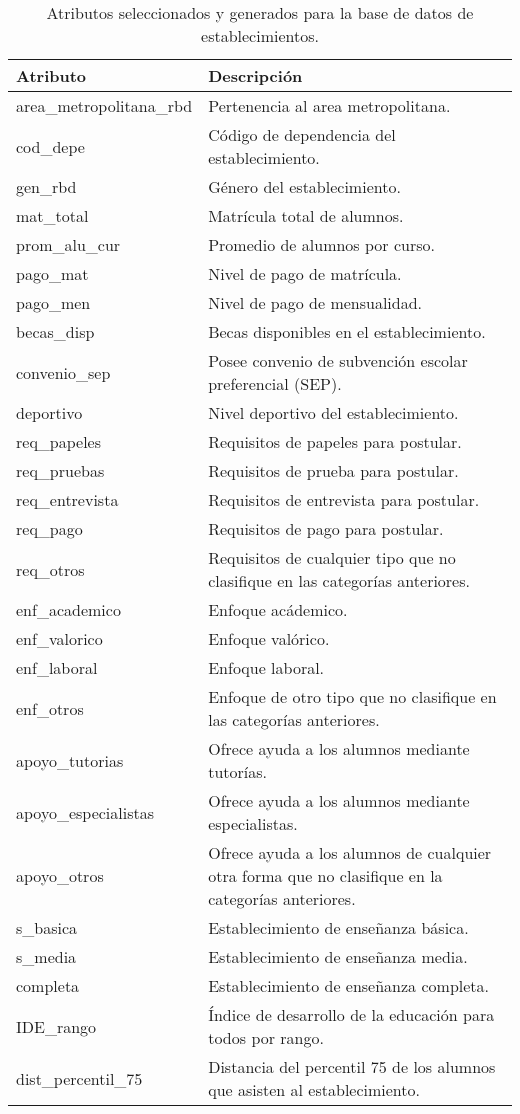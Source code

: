 \begin{table}[]
\centering
\caption{Atributos seleccionados y generados para la base de datos de establecimientos.}
\label{my-label}
\begin{tabular}{|p{5cm}|p{9	cm}|}
\hline
\textbf{Atributo}  & \textbf{Descripción} \\ \hline
area\_metropolitana\_rbd & Pertenencia al area metropolitana. \\ \hline
cod\_depe & Código de dependencia del establecimiento. \\ \hline
gen\_rbd & Género del establecimiento. \\ \hline
mat\_total & Matrícula total de alumnos. \\ \hline
prom\_alu\_cur & Promedio de alumnos por curso. \\ \hline
pago\_mat & Nivel de pago de matrícula. \\ \hline
pago\_men & Nivel de pago de mensualidad. \\ \hline
becas\_disp & Becas disponibles en el establecimiento. \\ \hline
convenio\_sep & Posee convenio de subvención escolar preferencial (SEP). \\ \hline
deportivo & Nivel deportivo del establecimiento. \\ \hline
req\_papeles & Requisitos de papeles para postular. \\ \hline
req\_pruebas & Requisitos de prueba para postular. \\ \hline
req\_entrevista & Requisitos de entrevista para postular. \\ \hline
req\_pago & Requisitos de pago para postular. \\ \hline
req\_otros & Requisitos de cualquier tipo que no clasifique en las categorías anteriores. \\ \hline
enf\_academico & Enfoque acádemico. \\ \hline
enf\_valorico & Enfoque valórico. \\ \hline
enf\_laboral & Enfoque laboral. \\ \hline
enf\_otros & Enfoque de otro tipo que no clasifique en las categorías anteriores. \\ \hline
apoyo\_tutorias & Ofrece ayuda a los alumnos mediante tutorías. \\ \hline
apoyo\_especialistas & Ofrece ayuda a los alumnos mediante especialistas. \\ \hline
apoyo\_otros & Ofrece ayuda a los alumnos de cualquier otra forma que no clasifique en la categorías anteriores. \\ \hline
s\_basica & Establecimiento de enseñanza básica. \\ \hline
s\_media & Establecimiento de enseñanza media. \\ \hline
completa & Establecimiento de enseñanza completa. \\ \hline
IDE\_rango & Índice de desarrollo de la educación para todos por rango. \\ \hline
dist\_percentil\_75 & Distancia del percentil 75 de los alumnos que asisten al establecimiento. \\ \hline
\end{tabular}
\end{table}

